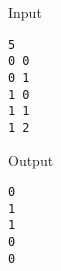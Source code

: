 Input
\begin{verbatim}
5
0 0
0 1
1 0
1 1
1 2\end{verbatim}

Output
\begin{verbatim}
0
1
1
0
0\end{verbatim}